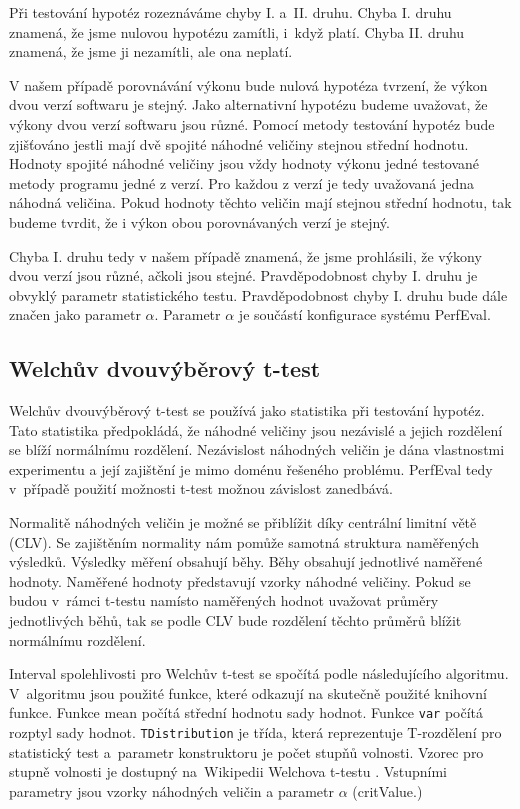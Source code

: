 Při testování hypotéz rozeznáváme
chyby I. a~II. druhu. Chyba I. druhu znamená, že jsme nulovou hypotézu zamítli,
i~když platí. Chyba II. druhu znamená, že jsme ji nezamítli, ale ona neplatí.

V našem případě porovnávání výkonu bude nulová hypotéza tvrzení, že výkon dvou verzí softwaru je stejný.
Jako alternativní hypotézu budeme uvažovat, že výkony dvou verzí softwaru jsou různé.
Pomocí metody testování hypotéz bude zjišťováno jestli mají dvě spojité náhodné veličiny stejnou střední hodnotu.
Hodnoty spojité náhodné veličiny jsou vždy hodnoty výkonu jedné testované metody programu jedné z verzí.
Pro každou z verzí je tedy uvažovaná jedna náhodná veličina.
Pokud hodnoty těchto veličin mají stejnou střední hodnotu, tak budeme tvrdit, že i výkon obou porovnávaných
verzí je stejný.

Chyba I. druhu tedy v našem případě znamená, že jsme prohlásili, že výkony dvou verzí jsou různé,
ačkoli jsou stejné. Pravděpodobnost chyby I. druhu je obvyklý parametr statistického testu.
Pravděpodobnost chyby I. druhu bude dále značen jako parametr $\alpha$. Parametr $\alpha$
je součástí konfigurace systému PerfEval.

\subsection{Welchův dvouvýběrový t-test}

Welchův dvouvýběrový t-test se používá jako statistika při testování hypotéz.
Tato statistika předpokládá, že náhodné veličiny jsou nezávislé a jejich rozdělení
se blíží normálnímu rozdělení. Nezávislost náhodných veličin je dána vlastnostmi
experimentu \cite[]{twosampletests} a její zajištění je mimo doménu řešeného problému. PerfEval
tedy v~případě použití možnosti t-test možnou závislost zanedbává.

Normalitě náhodných veličin je možné se přiblížit díky centrální limitní větě (CLV).
Se zajištěním normality nám pomůže samotná struktura naměřených výsledků. Výsledky měření
obsahují běhy. Běhy obsahují jednotlivé naměřené hodnoty. Naměřené hodnoty představují
vzorky náhodné veličiny. Pokud se budou v~rámci t-testu namísto naměřených hodnot uvažovat
průměry jednotlivých běhů, tak se podle CLV bude rozdělení těchto průměrů blížit normálnímu rozdělení.


Interval spolehlivosti pro Welchův t-test se spočítá podle následujícího algoritmu. V~algoritmu jsou
použité funkce, které odkazují na skutečně použité knihovní funkce. Funkce mean počítá střední hodnotu
sady hodnot. Funkce \texttt{var} počítá rozptyl sady hodnot. \lstinline{TDistribution} je třída, která reprezentuje T-rozdělení
pro statistický test a~parametr konstruktoru je počet stupňů volnosti. Vzorec pro stupně volnosti je dostupný na~Wikipedii
Welchova t-testu \cite[]{enwiki:1184251732}. Vstupními parametry jsou vzorky náhodných veličin a parametr $\alpha$ (critValue.)

